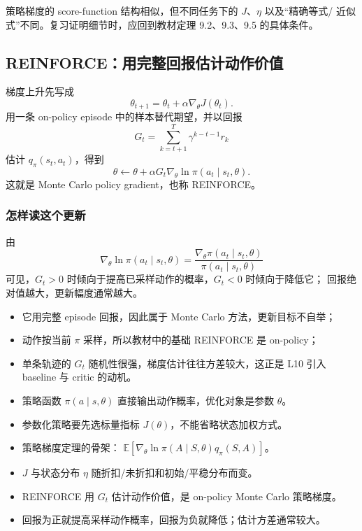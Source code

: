 \documentclass[11pt,a4paper,fontset=fandol]{ctexart}
\newcommand{\E}{\mathbb{E}}
\begin{document}
\begin{warningbox}[不要背成“任何 \(J\) 都配 \(d_\pi\)”]
策略梯度的 score-function 结构相似，但不同任务下的 \(J\)、\(\eta\) 以及“精确等式/
近似式”不同。复习证明细节时，应回到教材定理 9.2、9.3、9.5 的具体条件。
\end{warningbox}

\subsection{REINFORCE：用完整回报估计动作价值}

梯度上升先写成
\[
\theta_{t+1}=\theta_t+\alpha\nabla_\theta J(\theta_t).
\]
用一条 on-policy episode 中的样本替代期望，并以回报
\[
G_t=\sum_{k=t+1}^{T}\gamma^{k-t-1}r_k
\]
估计 \(q_\pi(s_t,a_t)\)，得到
\[
\boxed{
\theta\leftarrow\theta
+\alpha G_t\nabla_\theta
\ln\pi(a_t\mid s_t,\theta)}.
\]
这就是 Monte Carlo policy gradient，也称 REINFORCE。

\subsubsection{怎样读这个更新}

由
\[
\nabla_\theta\ln\pi(a_t\mid s_t,\theta)
=\frac{\nabla_\theta\pi(a_t\mid s_t,\theta)}
{\pi(a_t\mid s_t,\theta)}
\]
可见，\(G_t>0\) 时倾向于提高已采样动作的概率，\(G_t<0\) 时倾向于降低它；
回报绝对值越大，更新幅度通常越大。

\begin{warningbox}
\begin{itemize}
  \item 它用完整 episode 回报，因此属于 Monte Carlo 方法，更新目标不自举；
  \item 动作按当前 \(\pi\) 采样，所以教材中的基础 REINFORCE 是 on-policy；
  \item 单条轨迹的 \(G_t\) 随机性很强，梯度估计往往方差较大，这正是 L10
  引入 baseline 与 critic 的动机。
\end{itemize}
\end{warningbox}

\begin{memorybox}[L9 本章速记]
\begin{itemize}
  \item 策略函数 \(\pi(a\mid s,\theta)\) 直接输出动作概率，优化对象是参数 \(\theta\)。
  \item 参数化策略要先选标量指标 \(J(\theta)\)，不能省略状态加权方式。
  \item 策略梯度定理的骨架：
  \(\E[\nabla_\theta\ln\pi(A\mid S,\theta)q_\pi(S,A)]\)。
  \item \(J\) 与状态分布 \(\eta\) 随折扣/未折扣和初始/平稳分布而变。
  \item REINFORCE 用 \(G_t\) 估计动作价值，是 on-policy Monte Carlo 策略梯度。
  \item 回报为正就提高采样动作概率，回报为负就降低；估计方差通常较大。
\end{itemize}
\end{memorybox}
\end{document}
